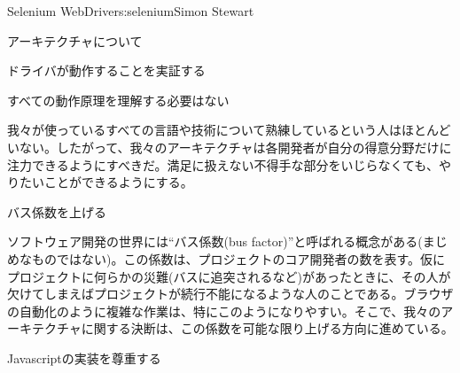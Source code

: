 \begin{aosachapter}{Selenium WebDriver}{s:selenium}{Simon Stewart}
\begin{aosasect1}{アーキテクチャについて}
\begin{aosasect2}{ドライバが動作することを実証する}
\end{aosasect2}

\begin{aosasect2}{すべての動作原理を理解する必要はない}

我々が使っているすべての言語や技術について熟練しているという人はほとんどいない。したがって、我々のアーキテクチャは各開発者が自分の得意分野だけに注力できるようにすべきだ。満足に扱えない不得手な部分をいじらなくても、やりたいことができるようにする。

\end{aosasect2}

\begin{aosasect2}{バス係数を上げる}

ソフトウェア開発の世界には``バス係数(bus factor)''と呼ばれる概念がある(まじめなものではない)。この係数は、プロジェクトのコア開発者の数を表す。仮にプロジェクトに何らかの災難(バスに追突されるなど)があったときに、その人が欠けてしまえばプロジェクトが続行不能になるような人のことである。ブラウザの自動化のように複雑な作業は、特にこのようになりやすい。そこで、我々のアーキテクチャに関する決断は、この係数を可能な限り上げる方向に進めている。

\end{aosasect2}

\begin{aosasect2}{Javascriptの実装を尊重する}


\end{aosasect2}
\end{aosasect1}
\end{aosachapter}
